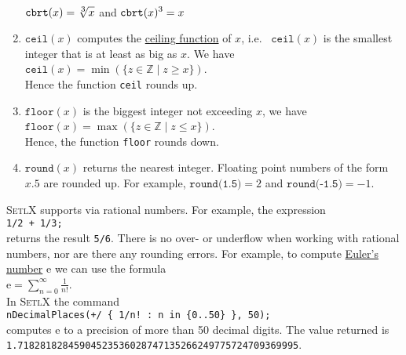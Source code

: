 \begin{enumerate}
      \\[0.2cm]
      \hspace*{1.3cm}
      $\displaystyle\texttt{cbrt}(x) = \sqrt[\mbox{\scriptsize$3$}]{x}$ \quad and \quad $\displaystyle\texttt{cbrt}(x)^3 = x$
\item $\texttt{ceil}(x)$ computes the \href{https://en.wikipedia.org/wiki/Floor_and_ceiling_functions}{ceiling
      function} of $x$, i.e.~ $\mathtt{ceil}(x)$ is the smallest integer that is at least as big as $x$.  We have
      \\[0.2cm]
      \hspace*{1.3cm}
      $\texttt{ceil}(x) = \min(\{ z \in \mathbb{Z} \mid z \geq x \})$.
      \\[0.2cm]
      Hence the function \texttt{ceil} rounds up.
\item $\texttt{floor}(x)$ is the biggest integer not exceeding $x$, we have
      \\[0.2cm]
      \hspace*{1.3cm}
      $\texttt{floor}(x) = \max(\{ z \in \mathbb{Z} \mid z \leq x \})$.
      \\[0.2cm]
      Hence, the function \texttt{floor} rounds down.
\item $\texttt{round}(x)$ returns the nearest integer.  Floating point numbers of the form $x.5$ are rounded up.
      For example, $\texttt{round(1.5)}=2$ and $\texttt{round(-1.5)}=-1$.
\end{enumerate}
\textsc{SetlX} supports  via rational numbers.  For example, the expression
\\[0.2cm]
\hspace*{1.3cm}
\texttt{1/2 + 1/3;}
\\[0.2cm]
returns the result \texttt{5/6}.  There is no over- or underflow when working with rational numbers, nor are
there any rounding errors.  For example, to compute
\href{https://en.wikipedia.org/wiki/E_(mathematical_constant)}{Euler's number} $\mathrm{e}$ we can use the formula
\\[0.2cm]
\hspace*{1.3cm}
$\displaystyle \mathrm{e} = \sum\limits_{n=0}^\infty \frac{1}{n!}$.
\\[0.2cm]
In \textsc{SetlX} the command
\\[0.2cm]
\hspace*{1.3cm}
\texttt{nDecimalPlaces(+/ \{ 1/n! : n in \{0..50\} \}, 50);}
\\[0.2cm]
computes $\mathrm{e}$ to a precision of more than 50 decimal digits.  The value returned is
\\[0.2cm]
\hspace*{1.3cm}
\texttt{1.71828182845904523536028747135266249775724709369995}.



